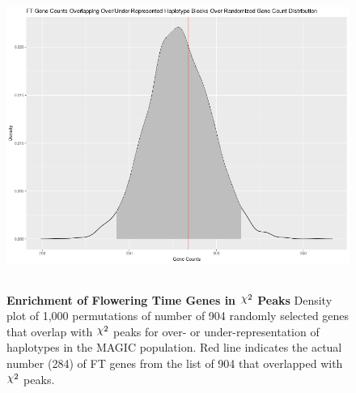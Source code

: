\documentclass[9pt,twocolumn,twoside]{gsag3jnl}
\DeclareRobustCommand{\rchi}{{\mathpalette\irchi\relax}}
\newcommand{\irchi}[2]{\raisebox{\depth}{$#1\chi$}} %
\begin{document}
\begin{figure}[ht]
\centering
\includegraphics[width=16cm,height=10cm]{figures/ft_overlap_enrichment_density.png}
\caption{\textbf{Enrichment of Flowering Time Genes in $\rchi^2$ Peaks} Density plot of 1,000 permutations of number of 904 randomly selected genes that overlap with $\rchi^2$ peaks for over- or under-representation of haplotypes in the MAGIC population. Red line indicates the actual number (284) of FT genes from the list of 904 that overlapped with $\rchi^2$ peaks.}
\label{fig:supfigure4}
\end{figure}


\endsupplement
\end{document}
